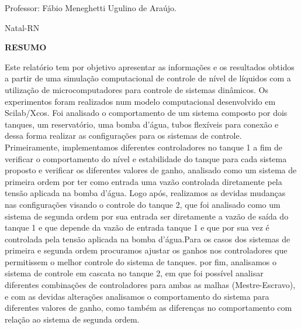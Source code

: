 \documentclass[a4paper,12pt]{article}
\newcommand{\cityandyear}{
\large Natal-RN\\
 \the\year 
 }
\begin{document}
\vspace{2cm}

\begin{center}

Professor:  Fábio Meneghetti Ugulino de Araújo.

\vspace{2.5cm}

\cityandyear

\end{center}

\newpage


\thispagestyle{empty}

\begin{center}
{\large \textbf{RESUMO}}
\end{center}

\vspace{1cm}

\begin{flushleft}

 \hspace{4ex}Este relatório tem por objetivo apresentar as informações e os resultados obtidos a partir de uma simulação computacional de controle de nível de líquidos com a utilização de microcomputadores para controle de sistemas dinâmicos. Os experimentos foram realizados num modelo computacional desenvolvido em Scilab/Xcos. Foi analisado o comportamento de um sistema composto por dois tanques, um reservatório, uma bomba d’água, tubos flexíveis para conexão e dessa forma realizar as configurações para os sistemas de controle. Primeiramente, implementamos diferentes controladores no tanque 1 a fim de verificar o comportamento do nível e estabilidade do tanque para cada sistema proposto e verificar os diferentes valores de ganho, analisado como um sistema de primeira ordem por ter como entrada uma vazão controlada diretamente pela tensão aplicada na bomba d'água. Logo após, realizamos as devidas mudanças nas configurações visando o controle do tanque 2, que foi analisado como um sistema de segunda ordem por sua entrada ser diretamente a vazão de saída do tanque 1 e que depende da vazão de entrada tanque 1 e que por sua vez é controlada pela tensão aplicada na bomba d'água.Para os casos dos sistemas de primeira e segunda ordem procuramos ajustar os ganhos nos controladores que permitissem o melhor controle do sistema de tanques. por fim, analisamos o sistema de controle em cascata no tanque 2, em que foi possível analisar diferentes combinações de controladores para ambas as malhas (Mestre-Escravo), e com as devidas alterações analisamos o comportamento do sistema para diferentes valores de ganho, como também as diferenças no comportamento com relação ao sistema de segunda ordem.

\end{flushleft}
\end{document}
